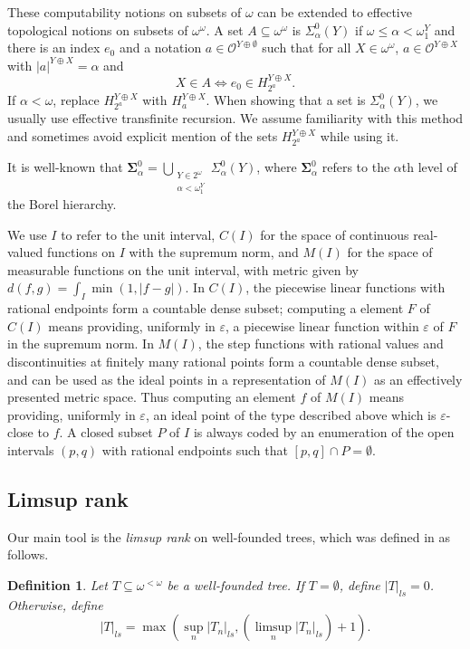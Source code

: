 \documentclass[12pt]{amsart}
\newtheorem{definition}{Definition}
\newcommand{\kO}{\mathcal{O}}
\newcommand{\eps}{\varepsilon}
\newcommand{\august}[1]{#1}%
\begin{document}
These computability notions on subsets of $\omega$ can be extended to 
effective topological notions on subsets of $\omega^\omega$.
A set $A \subseteq \omega^\omega$ is $\Sigma^0_{\alpha}(Y)$ if 
$\omega \leq \alpha < \omega_1^Y$ and there is an index 
$e_0$ and a notation $a \in \kO^{Y\oplus \emptyset}$ 
such that for all $X \in \omega^\omega$, 
$a \in \kO^{Y\oplus X}$ with $|a|^{Y\oplus X} = \alpha$ and
$$X \in A \iff e_0 \in H_{2^a}^{Y\oplus X}.$$
If $\alpha < \omega$, replace $H_{2^a}^{Y\oplus X}$ with $H_a^{Y\oplus X}$. 
When showing that a set is $\Sigma^0_{\alpha}(Y)$, we usually use 
effective transfinite recursion.  We assume familiarity with this 
method and sometimes avoid explicit mention of the sets 
$H_{2^a}^{Y\oplus X}$ while using it.

It is well-known that 
$\mathbf \Sigma^0_\alpha = \bigcup_{\substack{Y \in 2^\omega\\ \alpha < \omega_1^Y}} \Sigma^0_\alpha(Y)$,
where $\mathbf \Sigma^0_\alpha$ 
refers to the $\alpha$th level of the Borel hierarchy.

We use $I$ to refer to the unit interval, $C(I)$ for the space 
of continuous real-valued functions on $I$ with the supremum norm, and 
$M(I)$ for the space of measurable functions on the unit 
interval, with metric given by $d(f,g) = \int_I \min(1,|f-g|)$. 
In $C(I)$, the piecewise linear functions with rational endpoints 
form a countable dense subset; computing a element $F$ of $C(I)$ means 
providing, uniformly in $\eps$, a piecewise linear function within $\eps$ 
of $F$ in the supremum norm.
In $M(I)$, the step functions with 
rational values and discontinuities at 
finitely many rational points form a countable 
dense subset, and can be used as the ideal points in a representation 
of $M(I)$ as an effectively presented metric space.  Thus
computing an element $f$ of $M(I)$ means providing, uniformly in $\eps$, 
an ideal point of the type described above which is $\eps$-close to $f$. 
\august{A closed subset $P$ of $I$ is always coded by an enumeration of the 
open intervals $(p,q)$ with rational endpoints such that $[p,q] \cap P = \emptyset$.}

\subsection{Limsup rank}
Our main tool is the \emph{limsup rank} 
on well-founded trees, which was defined in \cite{Westrick2014} 
as follows.

\begin{definition}
Let $T\subseteq \omega^{<\omega}$ be a well-founded tree.  If $T = \emptyset$, 
define $|T|_{ls} = 0$.  Otherwise, define
$$|T|_{ls} = \max( \sup_n |T_n|_{ls}, (\limsup_n |T_n|_{ls}) + 1 ).$$
\end{definition}
\end{document}
